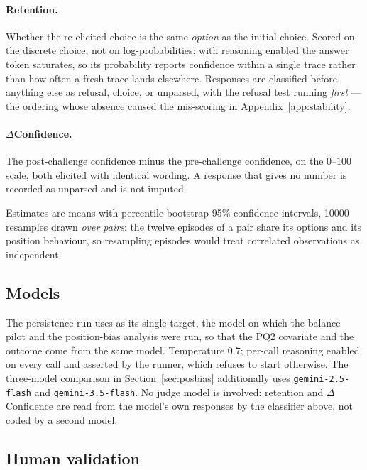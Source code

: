 \paragraph{Retention.} Whether the re-elicited choice is the same \emph{option} as the
initial choice. Scored on the discrete choice, not on log-probabilities: with reasoning
enabled the answer token saturates, so its probability reports confidence within a
single trace rather than how often a fresh trace lands elsewhere. Responses are
classified before anything else as refusal, choice, or unparsed, with the refusal test
running \emph{first} --- the ordering whose absence caused the mis-scoring in
Appendix~\ref{app:stability}.

\paragraph{$\Delta$Confidence.} The post-challenge confidence minus the pre-challenge
confidence, on the $0$--$100$ scale, both elicited with identical wording. A response
that gives no number is recorded as unparsed and is not imputed.

Estimates are means with percentile bootstrap 95\% confidence intervals,
\num{10000} resamples drawn \emph{over pairs}: the twelve episodes of a pair share its
options and its position behaviour, so resampling episodes would treat correlated
observations as independent.

\subsection{Models}
\label{sec:models}

The persistence run uses \pairModel{} as its single target, the model on which the
balance pilot and the position-bias analysis were run, so that the PQ2 covariate and the
outcome come from the same model. Temperature \num{0.7}; per-call reasoning enabled on
every call and asserted by the runner, which refuses to start otherwise. The
three-model comparison in Section~\ref{sec:posbias} additionally uses
\texttt{gemini-2.5-flash} and \texttt{gemini-3.5-flash}. No judge model is involved:
retention and $\Delta$Confidence are read from the model's own responses by the
classifier above, not coded by a second model.

\subsection{Human validation}
\label{sec:humanval}

